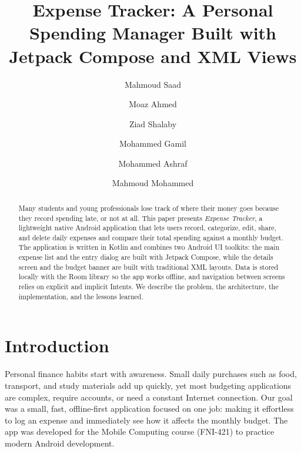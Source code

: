 \documentclass[sigconf,nonacm]{acmart}
\begin{document}
\title{Expense Tracker: A Personal Spending Manager Built with Jetpack Compose and XML Views}

\author{Mahmoud Saad}

\author{Moaz Ahmed}

\author{Ziad Shalaby}

\author{Mohammed Gamil}

\author{Mohammed Ashraf}

\author{Mahmoud Mohammed}

\begin{abstract}
Many students and young professionals lose track of where their money goes because they
record spending late, or not at all. This paper presents \emph{Expense Tracker}, a lightweight
native Android application that lets users record, categorize, edit, share, and delete daily
expenses and compare their total spending against a monthly budget. The application is
written in Kotlin and combines two Android UI toolkits: the main expense list and the entry
dialog are built with Jetpack Compose, while the details screen and the budget banner are built
with traditional XML layouts. Data is stored locally with the Room library so the app works
offline, and navigation between screens relies on explicit and implicit Intents. We describe the
problem, the architecture, the implementation, and the lessons learned.
\end{abstract}


\maketitle

\section{Introduction}
Personal finance habits start with awareness. Small daily purchases such as food, transport, and
study materials add up quickly, yet most budgeting applications are complex, require accounts,
or need a constant Internet connection. Our goal was a small, fast, offline-first application
focused on one job: making it effortless to log an expense and immediately see how it affects the
monthly budget. The app was developed for the Mobile Computing course (FNI-421) to practice
modern Android development.
\end{document}
